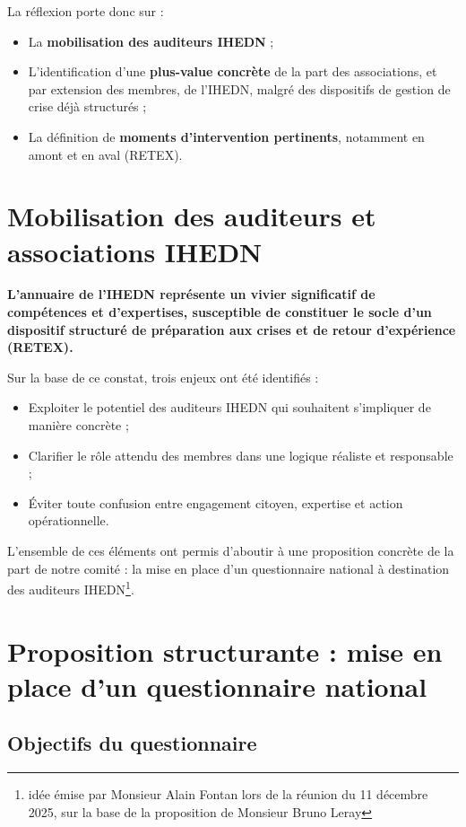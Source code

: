 \documentclass[12pt,a4paper]{article}
\begin{document}
La réflexion porte donc sur :
\begin{itemize}
\item La \textbf{mobilisation des auditeurs IHEDN} ;
\item L'identification d'une \textbf{plus-value concrète} de la part des associations, et par extension des membres, de l'IHEDN, malgré des dispositifs de gestion de crise déjà structurés ;
\item La définition de \textbf{moments d'intervention pertinents}, notamment en amont et en aval (RETEX).

\end{itemize}

\section{Mobilisation des auditeurs et associations IHEDN}

\textbf{L'annuaire de l'IHEDN représente un vivier significatif de compétences et d'expertises, susceptible de constituer le socle d'un dispositif structuré de préparation aux crises et de retour d'expérience (RETEX).}

Sur la base de ce constat, trois enjeux ont été identifiés :
\begin{itemize}
\item Exploiter le potentiel des auditeurs IHEDN qui souhaitent s'impliquer de manière concrète ;
\item Clarifier le rôle attendu des membres dans une logique réaliste et responsable ;
\item Éviter toute confusion entre engagement citoyen, expertise et action opérationnelle.
\end{itemize}

L'ensemble de ces éléments ont permis d'aboutir à une proposition concrète de la part de notre comité : la mise en place d'un questionnaire national à destination des auditeurs IHEDN\footnote{idée émise par Monsieur Alain Fontan lors de la réunion du 11 décembre 2025, sur la base de la proposition de Monsieur Bruno Leray}. 

\section{Proposition structurante : mise en place d'un questionnaire national}

\subsection{Objectifs du questionnaire}
\end{document}
